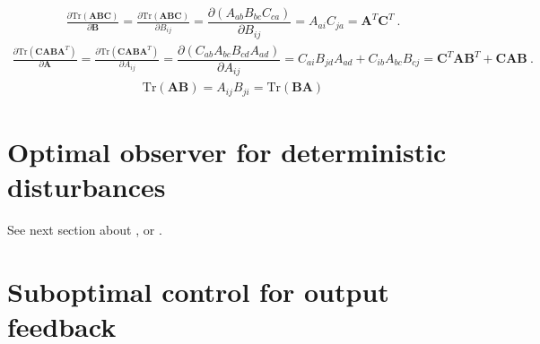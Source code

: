 \documentclass[letterpaper,10pt,english]{jupyterBook}
\begin{document}
\begin{equation*}
\begin{split}\frac{\partial \text{Tr}(\mathbf{A} \mathbf{B} \mathbf{C})}{\partial \mathbf{B}} = \frac{\partial \text{Tr}(\mathbf{A} \mathbf{B} \mathbf{C})}{\partial B_{ij}} = \dfrac{\partial ( A_{ab} B_{bc} C_{ca} )}{\partial B_{ij}} = A_{ai} C_{ja} = \mathbf{A}^T \mathbf{C}^T \ .\end{split}
\end{equation*}\begin{equation*}
\begin{split}\frac{\partial \text{Tr}(\mathbf{C} \mathbf{A} \mathbf{B} \mathbf{A}^T)}{\partial \mathbf{A}} = \frac{\partial \text{Tr}(\mathbf{C} \mathbf{A} \mathbf{B} \mathbf{A}^T)}{\partial A_{ij}} = \dfrac{\partial ( C_{ab} A_{bc} B_{cd} A_{ad} )}{\partial A_{ij}} = C_{ai} B_{jd} A_{ad} + C_{ib} A_{bc} B_{cj} = \mathbf{C}^T \mathbf{A} \mathbf{B}^T + \mathbf{C} \mathbf{A} \mathbf{B} \ .\end{split}
\end{equation*}\begin{equation*}
\begin{split}\text{Tr}(\mathbf{A} \mathbf{B}) = A_{ij} B_{ji} = \text{Tr}( \mathbf{B} \mathbf{A} )\end{split}
\end{equation*}
\sphinxstepscope


\section{Optimal observer for deterministic disturbances}
\label{\detokenize{ch/control/optimal-control-observer-deterministic:optimal-observer-for-deterministic-disturbances}}\label{\detokenize{ch/control/optimal-control-observer-deterministic:control-optimal-observer-deterministic}}\label{\detokenize{ch/control/optimal-control-observer-deterministic::doc}}
\sphinxAtStartPar
See next section about {\hyperref[\detokenize{ch/control/optimal-control-observer-stochastic:control-optimal-observer-stochastic}]{}}, or .



\sphinxstepscope


\section{Sub\sphinxhyphen{}optimal control for output feedback}
\label{\detokenize{ch/control/optimal-control-output:sub-optimal-control-for-output-feedback}}\label{\detokenize{ch/control/optimal-control-output:control-optimal-output-fb}}\label{\detokenize{ch/control/optimal-control-output::doc}}
\sphinxstepscope
\end{document}
